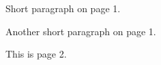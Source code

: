 \documentclass{book}
\begin{document}
Short paragraph on page 1.

Another short paragraph on page 1.

\pagebreak
This is page 2.
\end{document}
